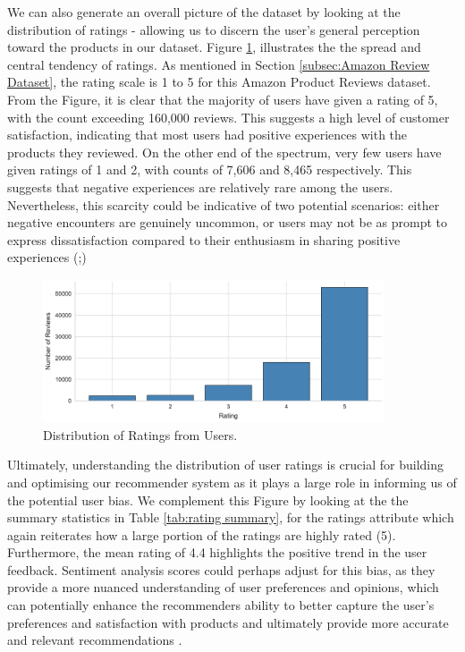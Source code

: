 We can also generate an overall picture of the dataset by looking at the distribution of ratings - allowing us to discern the user's general perception toward the products in our dataset. Figure \ref{fig:ratings distribution}, illustrates the the spread and central tendency of ratings. As mentioned in Section \ref{subsec:Amazon Review Dataset}, the rating scale is 1 to 5 for this Amazon Product Reviews dataset. From the Figure, it is clear that the majority of users have given a rating of 5, with the count exceeding 160,000 reviews. This suggests a high level of customer satisfaction, indicating that most users had positive experiences with the products they reviewed. On the other end of the spectrum, very few users have given ratings of 1 and 2, with counts of 7,606 and 8,465 respectively. This suggests that negative experiences are relatively rare among the users. Nevertheless, this scarcity could be indicative of two potential scenarios: either negative encounters are genuinely uncommon, or users may not be as prompt to express dissatisfaction compared to their enthusiasm in sharing positive experiences (\cite{chen2015augmenting};\cite{skalicky2015statistical})

\begin{figure}[h]
  \centering
  \includegraphics[width=0.9\textwidth]{Figures/rating_distribution.pdf} %
  \caption{Distribution of Ratings from Users.}
  \label{fig:ratings distribution}
\end{figure}

Ultimately, understanding the distribution of user ratings is crucial for building and optimising our recommender system as it plays a large role in informing us of the potential user bias. We complement this Figure by looking at the the summary statistics in Table \ref{tab:rating summary}, for the ratings attribute which again reiterates how a large portion of the ratings are highly rated (5). Furthermore, the mean rating of 4.4 highlights the positive trend in the user feedback. Sentiment analysis scores could perhaps adjust for this bias, as they provide a more nuanced understanding of user preferences and opinions, which can potentially enhance the recommenders  ability to better capture the user's preferences and satisfaction with products and ultimately provide more accurate and relevant recommendations \cite{dang2021approach}.


